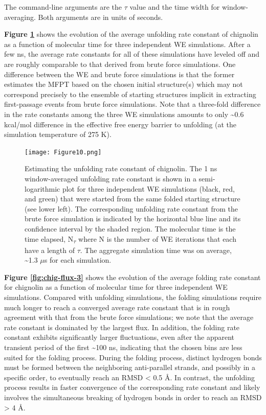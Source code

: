 The command-line arguments are the $\tau$ value and the time width for window-averaging. 
Both arguments are in units of seconds.
 
\textbf{Figure \ref{fig:chig-flux}} shows the evolution of the average unfolding rate constant of chignolin as a function of molecular time for three independent WE simulations. 
After a few ns, the average rate constants for all of these simulations have leveled off and are roughly comparable to that derived from brute force simulations. 
One difference between the WE and brute force simulations is that the former estimates the MFPT based on the chosen initial structure(s) which may not correspond precisely to the ensemble of starting structures implicit in extracting first-passage events from brute force simulations. 
Note that a three-fold difference in the rate constants among the three WE simulations amounts to only \textasciitilde 0.6 kcal/mol difference in the effective free energy barrier to unfolding (at the simulation temperature of 275 K).

\begin{figure}
\texttt{[image: Figure10.png]}
\caption{Estimating the unfolding rate constant of chignolin. 
The 1 ns window-averaged unfolding rate constant is shown in a semi-logarithmic plot for three independent WE simulations (black, red, and green) that were started from the same folded starting structure (see lower left). 
The corresponding unfolding rate constant from the brute force simulation is indicated by the horizontal blue line and its confidence interval by the shaded region. 
The molecular time is the time elapsed, N\textsubscript{$\tau$} where N is the number of WE iterations that each have a length of $\tau$. 
The aggregate simulation time was on average, \textasciitilde 1.3 $\mu$s for each simulation.}
\label{fig:chig-flux}
\end{figure}

\textbf{Figure \ref{fig:chig-flux-3}} shows the evolution of the average folding rate constant for chignolin as a function of molecular time for three independent WE simulations. 
Compared with unfolding simulations, the folding simulations require much longer to reach a converged average rate constant that is in rough agreement with that from the brute force simulations; we note that the average rate constant is dominated by the largest flux. 
In addition, the folding rate constant exhibits significantly larger fluctuations, even after the apparent transient period of the first \textasciitilde 100 ns, indicating that the chosen bins are less suited for the folding process. 
During the folding process, distinct hydrogen bonds must be formed between the neighboring anti-parallel strands, and possibly in a specific order, to eventually reach an RMSD < 0.5 \AA. 
In contrast, the unfolding process results in faster convergence of the corresponding rate constant and likely involves the simultaneous breaking of hydrogen bonds in order to reach an RMSD > 4 \AA.

